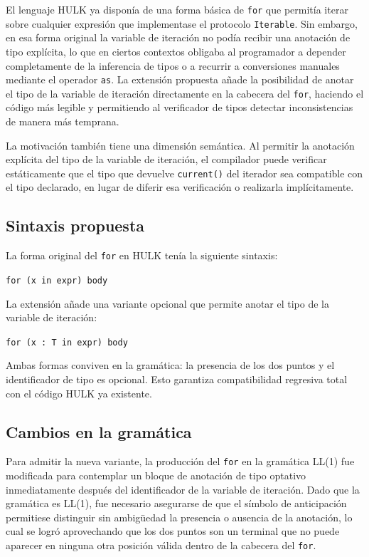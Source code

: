 \documentclass[12pt, a4paper]{article}
\begin{document}
El lenguaje HULK ya disponía de una forma básica de \texttt{for} que permitía iterar sobre cualquier expresión que implementase el protocolo \texttt{Iterable}. Sin embargo, en esa forma original la variable de iteración no podía recibir una anotación de tipo explícita, lo que en ciertos contextos obligaba al programador a depender completamente de la inferencia de tipos o a recurrir a conversiones manuales mediante el operador \texttt{as}. La extensión propuesta añade la posibilidad de anotar el tipo de la variable de iteración directamente en la cabecera del \texttt{for}, haciendo el código más legible y permitiendo al verificador de tipos detectar inconsistencias de manera más temprana.

La motivación también tiene una dimensión semántica. Al permitir la anotación explícita del tipo de la variable de iteración, el compilador puede verificar estáticamente que el tipo que devuelve \texttt{current()} del iterador sea compatible con el tipo declarado, en lugar de diferir esa verificación o realizarla implícitamente.

\subsection{Sintaxis propuesta}

La forma original del \texttt{for} en HULK tenía la siguiente sintaxis:

\begin{center}
\texttt{for (x in expr) body}
\end{center}

La extensión añade una variante opcional que permite anotar el tipo de la variable de iteración:

\begin{center}
\texttt{for (x : T in expr) body}
\end{center}

Ambas formas conviven en la gramática: la presencia de los dos puntos y el identificador de tipo es opcional. Esto garantiza compatibilidad regresiva total con el código HULK ya existente.

\subsection{Cambios en la gramática}

Para admitir la nueva variante, la producción del \texttt{for} en la gramática LL(1) fue modificada para contemplar un bloque de anotación de tipo optativo inmediatamente después del identificador de la variable de iteración. Dado que la gramática es LL(1), fue necesario asegurarse de que el símbolo de anticipación permitiese distinguir sin ambigüedad la presencia o ausencia de la anotación, lo cual se logró aprovechando que los dos puntos son un terminal que no puede aparecer en ninguna otra posición válida dentro de la cabecera del \texttt{for}.
\end{document}
